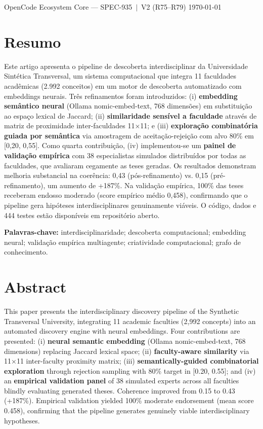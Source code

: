 \documentclass[a4paper,12pt]{article}
\begin{document}
\maketitle
\vspace{1cm}
{\large OpenCode Ecosystem Core --- SPEC-935~$\mid$~V2 (R75--R79)}
\vspace{0.3cm}
{\small \today}

\section*{Resumo}
Este artigo apresenta o pipeline de descoberta interdisciplinar da Universidade Sintética Transversal, 
um sistema computacional que integra 11 faculdades acadêmicas (2.992 conceitos) em um motor de descoberta 
automatizado com embeddings neurais. Três refinamentos foram introduzidos: (i) \textbf{embedding semântico 
neural} (Ollama nomic-embed-text, 768 dimensões) em substituição ao espaço lexical de Jaccard; 
(ii) \textbf{similaridade sensível a faculdade} através de matriz de proximidade inter-faculdades 11×11; 
e (iii) \textbf{exploração combinatória guiada por semântica} via amostragem de aceitação-rejeição com 
alvo 80\% em [0,20, 0,55]. Como quarta contribuição, (iv) implementou-se um \textbf{painel de validação 
empírica} com 38 especialistas simulados distribuídos por todas as faculdades, que avaliaram cegamente 
as teses geradas. Os resultados demonstram melhoria substancial na coerência: 0,43 (pós-refinamento) 
vs. 0,15 (pré-refinamento), um aumento de +187\%. Na validação empírica, 100\% das teses receberam 
endosso moderado (score empírico médio 0,458), confirmando que o pipeline gera hipóteses 
interdisciplinares genuinamente viáveis. O código, dados e 444 testes estão disponíveis em 
repositório aberto.

\textbf{Palavras-chave:} interdisciplinaridade; descoberta computacional; embedding neural; 
validação empírica multiagente; criatividade computacional; grafo de conhecimento.


\section*{Abstract}
This paper presents the interdisciplinary discovery pipeline of the Synthetic Transversal 
University, integrating 11 academic faculties (2,992 concepts) into an automated discovery 
engine with neural embeddings. Four contributions are presented: (i) \textbf{neural semantic 
embedding} (Ollama nomic-embed-text, 768 dimensions) replacing Jaccard lexical space; 
(ii) \textbf{faculty-aware similarity} via 11×11 inter-faculty proximity matrix; 
(iii) \textbf{semantically-guided combinatorial exploration} through rejection sampling with 
80\% target in [0.20, 0.55]; and (iv) an \textbf{empirical validation panel} of 38 simulated 
experts across all faculties blindly evaluating generated theses. Coherence improved from 
0.15 to 0.43 (+187\%). Empirical validation yielded 100\% moderate endorsement 
(mean score 0.458), confirming that the pipeline generates genuinely viable interdisciplinary 
hypotheses.
\end{document}
